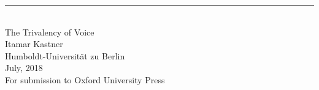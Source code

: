 \singlespacing
\begin{center}
\rule{165pt}{0pt} \\
\vspace{1cm}
\LARGE{The Trivalency of Voice}\\
\vspace{2cm}
\large{Itamar Kastner} \\
\vspace{0.4cm}
\normalsize{Humboldt-Universit\"at zu Berlin} \\
\vspace{1cm}
\normalsize{July, 2018} \\
\vspace{4cm}
\hfill \large{For submission to Oxford University Press}\\

\end{center}
